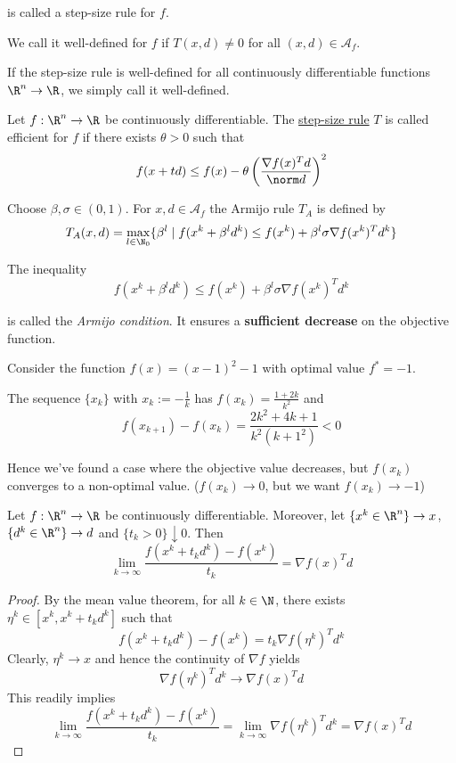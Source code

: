 is called a step-size rule for $f$.

We call it well-defined for $f$ if $T(x,d)\neq0$ for all
$(x,d)\in\mathcal{A}_f$.

If the step-size rule is well-defined for all continuously
differentiable functions ${\R}^n\to{\R}$, we simply call it
well-defined.


Let $f:\R^n\to\R$ be continuously differentiable. The
\hyperref[ae4eac6]{step-size rule} $T$ is called efficient for $f$ if
there exists $\theta>0$ such that
$$
	f(x+td)\leq f(x)-\theta\left(\frac{\nabla f(x)^Td}{\norm d}\right)^2
$$

\label{fefb024}

Choose $\beta,\sigma\in(0,1)$. For $x,d\in\hyperref[ae4eac6]{\mathcal
		A_f}$ the Armijo rule $T_A$ is defined by
$$
	T_A(x,d)=\max_{l\in\N_0}\{\beta^l\mid f(x^k+\beta^ld^k)\leq
	f(x^k)+\beta^l\sigma\nabla f(x^k)^Td^k\}
$$

The inequality
$$
	f(x^k+\beta^ld^k)\leq f(x^k)+\beta^l\sigma\nabla f(x^k)^Td^k
$$

is called the \textit{Armijo condition}. It ensures a
\textbf{sufficient decrease} on the objective function.


Consider the function $f(x)=(x-1)^2-1$ with optimal value $f^*=-1$.

The sequence $\{x_k\}$ with $x_k:=-\frac1k$ has
$f(x_k)=\frac{1+2k}{k^2}$ and
$$
	f(x_{k+1})-f(x_k)=\frac{2k^2+4k+1}{k^2(k+1^2)}<0
$$

Hence we've found a case where the objective value decreases, but
$f(x_k)$ converges to a non-optimal value. ($f(x_k)\to0$, but we want
$f(x_k)\to-1$)


Let $f:\R^n\to\R$ be continuously differentiable. Moreover, let
$\{x^k\in\R^n\}\to x$, $\{d^k\in\R^n\}\to d$ and
$\{t_k>0\}\downarrow0$. Then
$$
	\lim_{k\to\infty}\frac{f(x^k+t_kd^k)-f(x^k)}{t_k}=\nabla f(x)^Td
$$

\begin{proof}
	By the mean value theorem, for all $k\in\N$, there exists
	$\eta^k\in[x^k,x^k+t_kd^k]$ such that
	$$
		f(x^k+t_kd^k)-f(x^k)=t_k\nabla f(\eta^k)^Td^k
	$$
	Clearly, $\eta^k\to x$ and hence the continuity of $\nabla f$ yields
	$$
		\nabla f(\eta^k)^Td^k\to\nabla f(x)^Td
	$$
	This readily implies
	$$
		\lim_{k\to\infty}\frac{f(x^k+t_kd^k)-f(x^k)}{t_k}=
		\lim_{k\to\infty}\nabla f(\eta^k)^Td^k=
		\nabla f(x)^Td
	$$
\end{proof}

